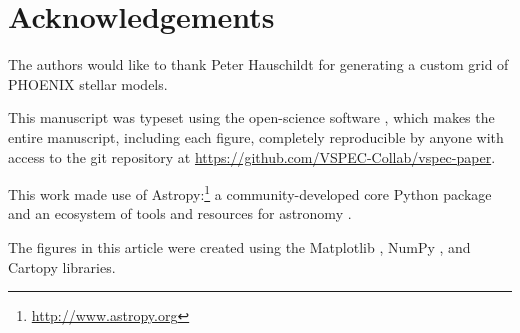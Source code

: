 \documentclass[twocolumn,linenumbers]{aastex631}
\begin{document}
\section{Acknowledgements}
The authors would like to thank Peter Hauschildt for generating a custom grid of PHOENIX stellar models.

This manuscript was typeset using the open-science software \showyourwork, which makes the entire manuscript, including each figure, completely reproducible by anyone with access to the git repository at \url{https://github.com/VSPEC-Collab/vspec-paper}.

This work made use of Astropy:\footnote{\url{http://www.astropy.org}} a community-developed core Python package and an ecosystem of tools and resources for astronomy \citep{astropycollaboration2013,astropycollaboration2018,astropycollaboration2022}.


The figures in this article were created using the Matplotlib \citep{hunter2007}, NumPy \citep{harris2020}, and Cartopy \citep{metoffice2010} libraries.


\end{document}

